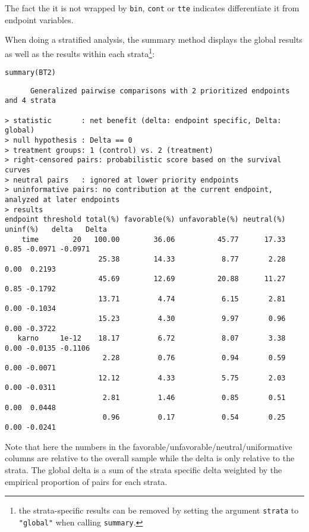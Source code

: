 \documentclass[12pt]{article}
\begin{document}
The fact the it is not wrapped by \texttt{bin}, \texttt{cont} or \texttt{tte} indicates
differentiate it from endpoint variables. 

\clearpage

When doing a stratified analysis, the summary method displays the
global results as well as the results within each strata\footnote{the
strata-specific results can be removed by setting the argument
\texttt{strata} to \texttt{"global"} when calling \texttt{summary}.}:
\lstset{language=r,label= ,caption= ,captionpos=b,numbers=none}
\begin{lstlisting}
summary(BT2)
\end{lstlisting}

\begin{verbatim}
      Generalized pairwise comparisons with 2 prioritized endpoints and 4 strata

> statistic       : net benefit (delta: endpoint specific, Delta: global) 
> null hypothesis : Delta == 0 
> treatment groups: 1 (control) vs. 2 (treatment) 
> right-censored pairs: probabilistic score based on the survival curves
> neutral pairs   : ignored at lower priority endpoints
> uninformative pairs: no contribution at the current endpoint, analyzed at later endpoints
> results
endpoint threshold total(%) favorable(%) unfavorable(%) neutral(%) uninf(%)   delta   Delta
    time        20   100.00        36.06          45.77      17.33     0.85 -0.0971 -0.0971
                      25.38        14.33           8.77       2.28     0.00  0.2193        
                      45.69        12.69          20.88      11.27     0.85 -0.1792        
                      13.71         4.74           6.15       2.81     0.00 -0.1034        
                      15.23         4.30           9.97       0.96     0.00 -0.3722        
   karno     1e-12    18.17         6.72           8.07       3.38     0.00 -0.0135 -0.1106
                       2.28         0.76           0.94       0.59     0.00 -0.0071        
                      12.12         4.33           5.75       2.03     0.00 -0.0311        
                       2.81         1.46           0.85       0.51     0.00  0.0448        
                       0.96         0.17           0.54       0.25     0.00 -0.0241
\end{verbatim}

Note that here the numbers in the
favorable/unfavorable/neutral/uniformative columns are relative to the
overall sample while the delta is only relative to the strata. The
global delta is a sum of the strata specific delta weighted by the
empirical proportion of pairs for each strata.
\end{document}
